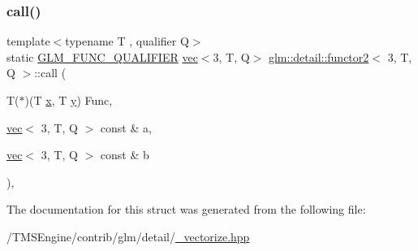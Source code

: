 \subsubsection{\texorpdfstring{call()}{call()}}
{\footnotesize\ttfamily template$<$typename T , qualifier Q$>$ \\
static \hyperlink{setup_8hpp_a33fdea6f91c5f834105f7415e2a64407}{G\+L\+M\+\_\+\+F\+U\+N\+C\+\_\+\+Q\+U\+A\+L\+I\+F\+I\+ER} \hyperlink{structglm_1_1vec}{vec}$<$3, T, Q$>$ \hyperlink{structglm_1_1detail_1_1functor2}{glm\+::detail\+::functor2}$<$ 3, T, Q $>$\+::call (\begin{DoxyParamCaption}\item[{T($\ast$)(T \hyperlink{_s_d_l__opengl_8h_ad0e63d0edcdbd3d79554076bf309fd47}{x}, T \hyperlink{_s_d_l__opengl_8h_a1675d9d7bb68e1657ff028643b4037e3}{y})}]{Func,  }\item[{\hyperlink{structglm_1_1vec}{vec}$<$ 3, T, Q $>$ const \&}]{a,  }\item[{\hyperlink{structglm_1_1vec}{vec}$<$ 3, T, Q $>$ const \&}]{b }\end{DoxyParamCaption})\hspace{0.3cm}{\ttfamily [inline]}, {\ttfamily [static]}}



The documentation for this struct was generated from the following file\+:\begin{DoxyCompactItemize}
\item 
/\+T\+M\+S\+Engine/contrib/glm/detail/\hyperlink{__vectorize_8hpp}{\+\_\+vectorize.\+hpp}\end{DoxyCompactItemize}
